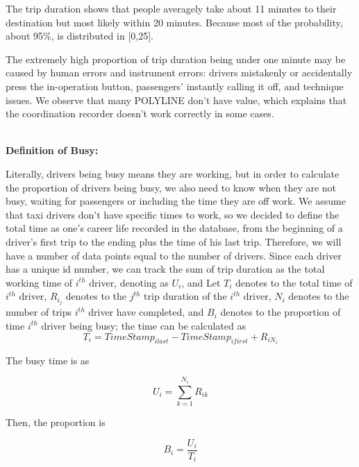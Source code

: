 \documentclass[11pt]{article}
\begin{document}
\par
The trip duration shows that people averagely take about 11 minutes to their destination but most likely within
 20 minutes. Because most of the probability, about 95\%, is distributed in [0,25].
\par
The extremely high proportion of trip duration being under one minute may be caused by human errors and instrument
 errors: drivers mistakenly or accidentally press the in-operation button, passengers' instantly calling it off,
 and technique issues. We observe that many POLYLINE don't have value, which explains that the coordination
 recorder doesn't work correctly in some cases. 

\\
\textbf{Definition of Busy:}

\par
Literally, drivers being busy means they are working, but in order to calculate the proportion of drivers being
 busy, we also need to know when they are not busy, waiting for passengers or including the time they are off work.
 We assume that taxi drivers don't have specific times to work, so we decided to define the total time as one's
 career life recorded in the database, from the beginning of a driver's first trip to the ending plus the time of
his last trip. Therefore, we will have a number of data points equal to the number of drivers. Since each driver
 has a unique id number, we can track the sum of trip duration as the total working time 
of $i^{th}$ driver, denoting as $U_{i}$, and Let $T_i$ denotes to the total time of $i^{th}$ driver, $R_{i_j}$ denotes
 to the $j^{th}$ trip duration of the $i^{th}$ driver, $N_i$ denotes to the number of trips $i^{th}$ driver have
 completed, and $B_i$ denotes to the proportion of time $i^{th}$ driver being busy; the time can be calculated as
\begin{equation}
T_i =TimeStamp_{i last}-TimeStamp_{i first} +R_{iN_i}
\end{equation}

\par
The busy time is as

\begin{equation}
U_i = \sum_{k=1}^{N_i} R_{ik}
\end{equation}

\par
Then, the proportion is

\begin{equation}
B_i = \frac{U_i}{T_i}
\end{equation}
\end{document}
